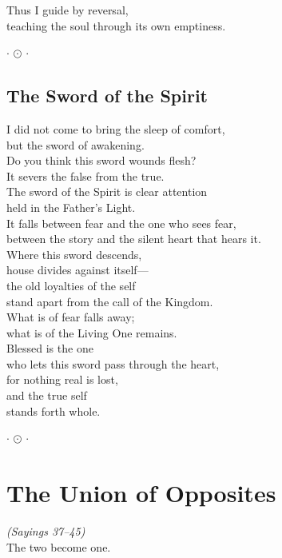 \documentclass[10pt, openright]{book}
\newcommand{\ornament}{
    \vspace{1.5cm}
    \begin{center}
        \large $\cdot$ $\odot$ $\cdot$
    \end{center}
    \vspace{1.5cm}
}
\begin{document}
Thus I guide by reversal, \\
teaching the soul through its own emptiness.

\ornament


\section{The Sword of the Spirit}
I did not come to bring the sleep of comfort, \\
but the sword of awakening. \\
Do you think this sword wounds flesh? \\
It severs the false from the true. \\

The sword of the Spirit is clear attention \\
held in the Father's Light. \\
It falls between fear and the one who sees fear, \\
between the story and the silent heart that hears it. \\

Where this sword descends, \\
house divides against itself— \\
the old loyalties of the self \\
stand apart from the call of the Kingdom. \\
What is of fear falls away; \\
what is of the Living One remains. \\

Blessed is the one \\
who lets this sword pass through the heart, \\
for nothing real is lost, \\
and the true self \\
stands forth whole.

\ornament

\chapter{The Union of Opposites}
\begin{center}
    \textit{(Sayings 37--45)} \\
    \vspace{0.5cm}
    \small The two become one.
\end{center}
\vspace{0.5cm}
\end{document}
